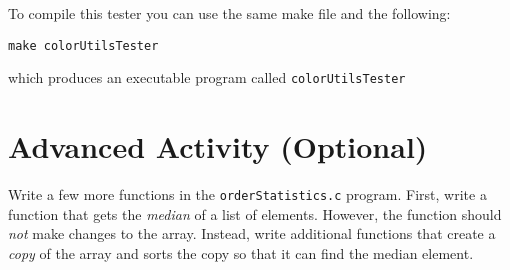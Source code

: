 \documentclass[12pt]{scrartcl}
\begin{document}
To compile this tester you can use the same make file and the
following:

\texttt{make colorUtilsTester}

which produces an executable program called \texttt{colorUtilsTester}

\section{Advanced Activity (Optional)}

Write a few more functions in the \texttt{orderStatistics.c} program.  First,
write a function that gets the \emph{median} of a list of elements.  However, the
function should \emph{not} make changes to the array.  Instead, write additional
functions that create a \emph{copy} of the array and sorts the copy so that it can
find the median element.  
\end{document}
